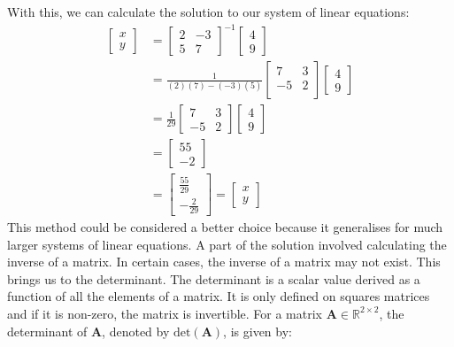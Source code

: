 \documentclass[a4paper,12pt]{article}
\newcommand{\matrx}[1]{\bm{#1}}
\newcommand{\real}{\mathbb{R}}
\newcommand{\dett}[1]{\text{det}(\matrx{#1})}
\begin{document}
	With this, we can calculate the solution to our system of linear equations:
	\begin{align}
		\begin{bmatrix}
			x \\ 
			y
		\end{bmatrix} &= \begin{bmatrix}
			2 & -3 \\
			5 & 7 
		\end{bmatrix}^{-1} \begin{bmatrix}
			4 \\
			9
		\end{bmatrix} \\
		&= \frac{1}{(2)(7)-(-3)(5)} \begin{bmatrix}
			7 & 3 \\
			-5 & 2 \\
		\end{bmatrix} \begin{bmatrix}
			4 \\
			9
		\end{bmatrix} \\
		&= \frac{1}{29} \begin{bmatrix}
			7 & 3 \\
			-5 & 2
		\end{bmatrix} \begin{bmatrix}
			4 \\
			9
		\end{bmatrix} \\
		&= \begin{bmatrix}
			55 \\
			-2
		\end{bmatrix} \\
		&= \begin{bmatrix}
			\frac{55}{29} \\
			- \frac{2}{29}
		\end{bmatrix} = \begin{bmatrix}
			x \\
			y
		\end{bmatrix}
	\end{align}
	This method could be considered a better choice because it generalises for much larger systems of linear equations. A part of the solution involved calculating the inverse of a matrix. In certain cases, the inverse of a matrix may not exist. This brings us to the determinant. The determinant is a scalar value derived as a function of all the elements of a matrix. It is only defined on squares matrices and if it is non-zero, the matrix is invertible. For a matrix $ \matrx{A} \in \real^{2 \times 2} $, the determinant of $ \matrx{A} $, denoted by $ \dett{A} $, is given by:
\end{document}
